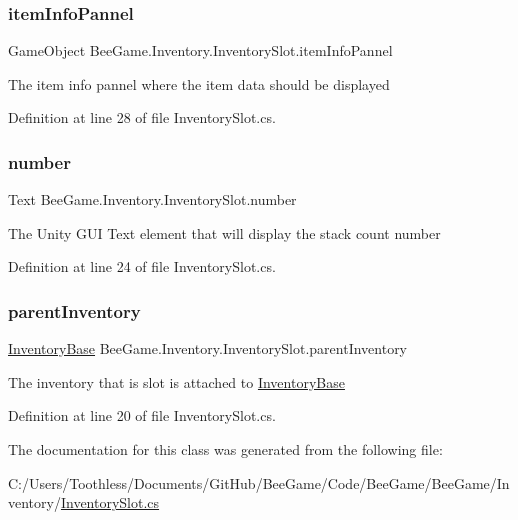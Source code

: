 \subsubsection{\texorpdfstring{item\+Info\+Pannel}{itemInfoPannel}}
{\footnotesize\ttfamily Game\+Object Bee\+Game.\+Inventory.\+Inventory\+Slot.\+item\+Info\+Pannel}



The item info pannel where the item data should be displayed 



Definition at line 28 of file Inventory\+Slot.\+cs.

\mbox{\label{class_bee_game_1_1_inventory_1_1_inventory_slot_adbdcece869818ee00193cf27bd9f46d4}} 
\subsubsection{\texorpdfstring{number}{number}}
{\footnotesize\ttfamily Text Bee\+Game.\+Inventory.\+Inventory\+Slot.\+number}



The Unity G\+UI Text element that will display the stack count number 



Definition at line 24 of file Inventory\+Slot.\+cs.

\mbox{\label{class_bee_game_1_1_inventory_1_1_inventory_slot_a06c37b35f2512ee2f0652a93129808e4}} 
\subsubsection{\texorpdfstring{parent\+Inventory}{parentInventory}}
{\footnotesize\ttfamily \hyperlink{class_bee_game_1_1_inventory_1_1_inventory_base}{Inventory\+Base} Bee\+Game.\+Inventory.\+Inventory\+Slot.\+parent\+Inventory}



The inventory that is slot is attached to \hyperlink{class_bee_game_1_1_inventory_1_1_inventory_base}{Inventory\+Base} 



Definition at line 20 of file Inventory\+Slot.\+cs.



The documentation for this class was generated from the following file\+:\begin{DoxyCompactItemize}
\item 
C\+:/\+Users/\+Toothless/\+Documents/\+Git\+Hub/\+Bee\+Game/\+Code/\+Bee\+Game/\+Bee\+Game/\+Inventory/\hyperlink{_inventory_slot_8cs}{Inventory\+Slot.\+cs}\end{DoxyCompactItemize}
